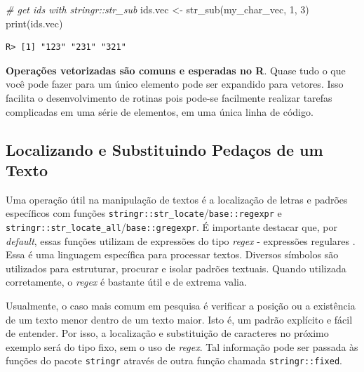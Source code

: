 \documentclass[
  11pt,
]{book}
\newenvironment{Shaded}{\begin{snugshade}}{\end{snugshade}}
\newcommand{\CommentTok}[1]{\textcolor[rgb]{0.37,0.37,0.37}{\textit{#1}}}
\newcommand{\DecValTok}[1]{\textcolor[rgb]{0.06,0.06,0.06}{#1}}
\newcommand{\FunctionTok}[1]{\textcolor[rgb]{0,0,0}{#1}}
\newcommand{\NormalTok}[1]{#1}
\newcommand{\OtherTok}[1]{\textcolor[rgb]{0.37,0.37,0.37}{#1}}
\newenvironment{rmdimportant}
{\begin{importantblock}

	} {\end{importantblock}}
\begin{document}
\begin{Shaded}
\begin{Highlighting}[]
\CommentTok{\# get ids with stringr::str\_sub}
\NormalTok{ids.vec }\OtherTok{\textless{}{-}} \FunctionTok{str\_sub}\NormalTok{(my\_char\_vec, }\DecValTok{1}\NormalTok{, }\DecValTok{3}\NormalTok{)}
\FunctionTok{print}\NormalTok{(ids.vec)}
\end{Highlighting}
\end{Shaded}

\begin{verbatim}
R> [1] "123" "231" "321"
\end{verbatim}

\begin{rmdimportant}
\textbf{Operações vetorizadas são comuns e esperadas no R}. Quase tudo o
que você pode fazer para um único elemento pode ser expandido para
vetores. Isso facilita o desenvolvimento de rotinas pois pode-se
facilmente realizar tarefas complicadas em uma série de elementos, em
uma única linha de código.
\end{rmdimportant}

\hypertarget{localizando-e-substituindo-pedauxe7os-de-um-texto}{%
\subsection{Localizando e Substituindo Pedaços de um Texto}\label{localizando-e-substituindo-pedauxe7os-de-um-texto}}

Uma operação útil na manipulação de textos é a localização de letras e padrões específicos com funções \texttt{stringr::str\_locate}/\texttt{base::regexpr} e \texttt{stringr::str\_locate\_all}/\texttt{base::gregexpr}. É importante destacar que, por \emph{default}, essas funções utilizam de expressões do tipo \emph{regex} - expressões regulares \citep{thompson1968programming}. Essa é uma linguagem específica para processar textos. Diversos símbolos são utilizados para estruturar, procurar e isolar padrões textuais. Quando utilizada corretamente, o \emph{regex} é bastante útil e de extrema valia.  

Usualmente, o caso mais comum em pesquisa é verificar a posição ou a existência de um texto menor dentro de um texto maior. Isto é, um padrão explícito e fácil de entender. Por isso, a localização e substituição de caracteres no próximo exemplo será do tipo fixo, sem o uso de \emph{regex}. Tal informação pode ser passada às funções do pacote \texttt{stringr} através de outra função chamada \texttt{stringr::fixed}. 
\end{document}
